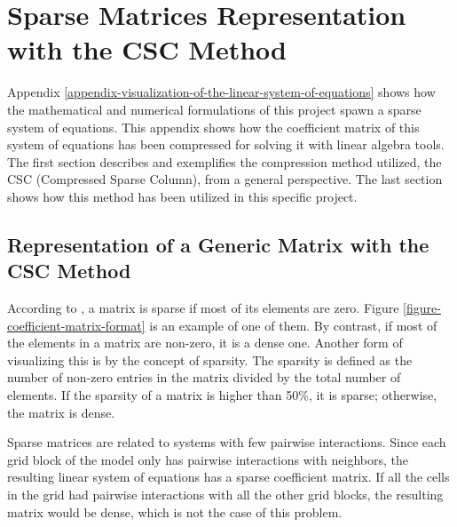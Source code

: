 \chapter{Sparse Matrices Representation with the CSC Method}
\label{appendix-sparse-matrix-representation}

Appendix \ref{appendix-visualization-of-the-linear-system-of-equations} shows how the mathematical and numerical formulations of this project spawn a sparse system of equations.
%
This appendix shows how the coefficient matrix of this system of equations has been compressed for solving it with linear algebra tools.
%
The first section describes and exemplifies the compression method utilized, the CSC (Compressed Sparse Column), from a general perspective.
%
The last section shows how this method has been utilized in this specific project.

\section{Representation of a Generic Matrix with the CSC Method}

According to \cite{Golub1996}, a matrix is sparse if most of its elements are zero. 
%
Figure \ref{figure-coefficient-matrix-format} is an example of one of them. 
%
By contrast, if most of the elements in a matrix are non-zero, it is a dense one. 
%
Another form of visualizing this is by the concept of sparsity. 
%
The sparsity is defined as the number of non-zero entries in the matrix divided by the total number of elements. 
%
If the sparsity of a matrix is higher than 50\%, it is sparse; otherwise, the matrix is dense.

Sparse matrices are related to systems with few pairwise interactions. 
%
Since each grid block of the model only has pairwise interactions with neighbors, the resulting linear system of equations has a sparse coefficient matrix. 
%
If all the cells in the grid had pairwise interactions with all the other grid blocks, the resulting matrix would be dense, which is not the case of this problem.

